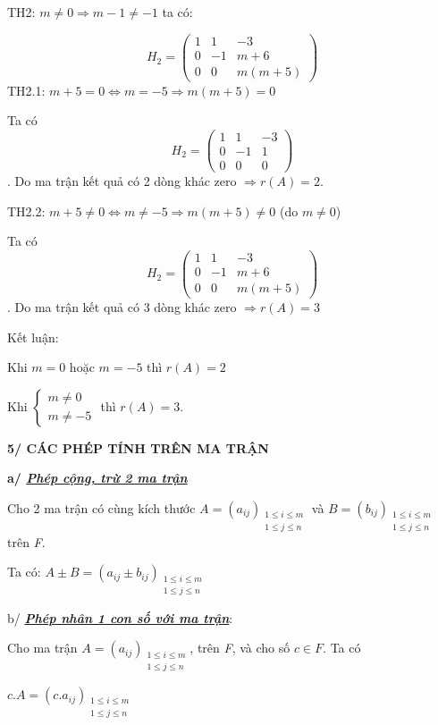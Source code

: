 \documentclass[12pt,a4paper]{article} \usepackage[utf8]{inputenc} \usepackage[T5]{fontenc} \usepackage[vietnamese]{babel} \usepackage{amsmath, amssymb, amsfonts} \usepackage{ulem}
\begin{document}
TH2: $m \neq 0 \Rightarrow m - 1 \neq -1$ ta có:

$$
H_2 = \begin{pmatrix} 1 & 1 & -3 \\ 0 & -1 & m+6 \\ 0 & 0 & m(m+5) \end{pmatrix}
$$
TH2.1: $m + 5 = 0 \Leftrightarrow m = -5 \Rightarrow m(m+5) = 0$

Ta có $$
H_2 = \begin{pmatrix} 1 & 1 & -3 \\ 0 & -1 & 1 \\ 0 & 0 & 0 \end{pmatrix}
$$. Do ma
trận kết quả có 2 dòng khác zero $\Rightarrow r(A) = 2$.

TH2.2: $m + 5 \neq 0 \Leftrightarrow m \neq -5 \Rightarrow m(m+5) \neq 0$ (do
$m \neq 0$)

Ta có $$
H_2 = \begin{pmatrix} 1 & 1 & -3 \\ 0 & -1 & m+6 \\ 0 & 0 & m(m+5) \end{pmatrix}
$$. Do ma
trận kết quả có 3 dòng khác zero $\Rightarrow r(A) = 3$

Kết luận:

Khi $m = 0$ hoặc $m = -5$ thì $r(A) = 2$

Khi $\begin{cases} m \neq 0 \\ m \neq -5 \end{cases}$ thì $r(A) = 3$.

\textbf{5/ CÁC PHÉP TÍNH TRÊN MA TRẬN}

\textbf{a/ \emph{\ul{Phép cộng, trừ 2 ma trận}}}

Cho 2 ma trận có cùng kích thước $A = (a_{ij})_{\substack{1 \le i \le m \\ 1 \le j \le n}}$ và $B = (b_{ij})_{\substack{1 \le i \le m \\ 1 \le j \le n}}$ trên \emph{F}.

Ta có: $A \pm B = (a_{ij} \pm b_{ij})_{\substack{1 \le i \le m \\ 1 \le j \le n}}$

b/ \emph{\textbf{\ul{Phép nhân 1 con số với ma trận}}}:

Cho ma trận $A = (a_{ij})_{\substack{1 \le i \le m \\ 1 \le j \le n}}$, trên \emph{F}, và cho số $c \in F$. Ta có

$c.A = (c.a_{ij})_{\substack{1 \le i \le m \\ 1 \le j \le n}}$
\end{document}
